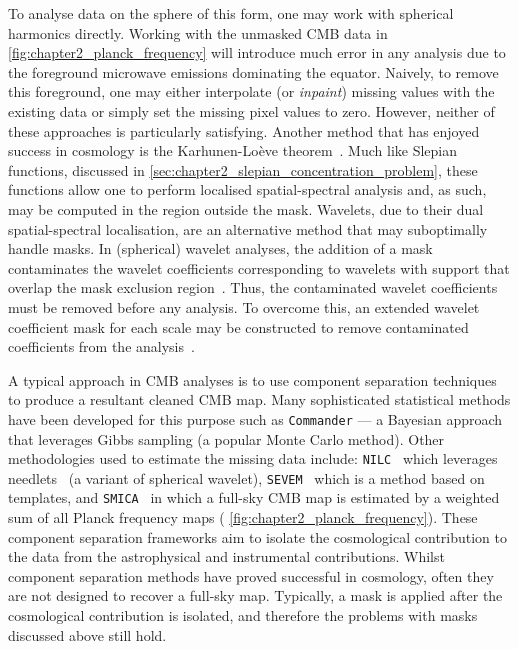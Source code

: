 To analyse data on the sphere of this form, one may work with spherical harmonics directly.
Working with the unmasked CMB data in \cref{fig:chapter2_planck_frequency} will introduce much error in any analysis due to the foreground microwave emissions dominating the equator.
Naively, to remove this foreground, one may either interpolate (or \emph{inpaint}) missing values with the existing data or simply set the missing pixel values to zero.
However, neither of these approaches is particularly satisfying.
Another method that has enjoyed success in cosmology is the Karhunen-Loève theorem~\cite{Tegmark1997,Bond1994,Bunn1995}.
Much like Slepian functions, discussed in \cref{sec:chapter2_slepian_concentration_problem}, these functions allow one to perform localised spatial-spectral analysis and, as such, may be computed in the region outside the mask.
Wavelets, due to their dual spatial-spectral localisation, are an alternative method that may suboptimally handle masks.
In (spherical) wavelet analyses, the addition of a mask contaminates the wavelet coefficients corresponding to wavelets with support that overlap the mask exclusion region~\cite{Vielva2004,McEwen2004}.
Thus, the contaminated wavelet coefficients must be removed before any analysis.
To overcome this, an extended wavelet coefficient mask for each scale may be constructed to remove contaminated coefficients from the analysis~\cite{McEwen2007a}.

A typical approach in CMB analyses is to use component separation techniques to produce a resultant cleaned CMB map.
Many sophisticated statistical methods have been developed for this purpose such as \texttt{Commander} --- a Bayesian approach that leverages Gibbs sampling (a popular Monte Carlo method).
Other methodologies used to estimate the missing data include: \texttt{NILC}~\cite{Basak2011,Basak2013,Planck2016,Planck2020a} which leverages needlets~\cite{Narcowich2006} (a variant of spherical wavelet), \texttt{SEVEM}~\cite{Leach2008,FernandezCobos2012,Planck2016,Planck2020a} which is a method based on templates, and \texttt{SMICA}~\cite{Cardoso2008,Planck2016,Planck2020a} in which a full-sky CMB map is estimated by a weighted sum of all Planck frequency maps (\cf{} \cref{fig:chapter2_planck_frequency}).
These component separation frameworks aim to isolate the cosmological contribution to the data from the astrophysical and instrumental contributions.
Whilst component separation methods have proved successful in cosmology, often they are not designed to recover a full-sky map.
Typically, a mask is applied after the cosmological contribution is isolated, and therefore the problems with masks discussed above still hold.

